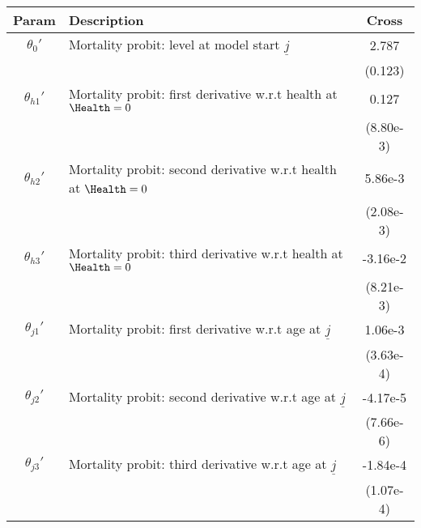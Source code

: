 \begin{table}[ht]\label{CrossWomenMortParams}
\footnotesize
\begin{center}
\begin{tabular}{clc}
\hline \hline
Param & Description & Cross \\
\hline
$\theta_{0}'$ & Mortality probit: level at model start $\underline{j}$ & 2.787 \\
 & & (0.123) \\
$\theta_{h1}'$ & Mortality probit: first derivative w.r.t health at $\Health=0$ & 0.127 \\
 & & (8.80e-3) \\
$\theta_{h2}'$ & Mortality probit: second derivative w.r.t health at $\Health=0$ & 5.86e-3 \\
 & & (2.08e-3) \\
$\theta_{h3}'$ & Mortality probit: third derivative w.r.t health at $\Health=0$ & -3.16e-2 \\
 & & (8.21e-3) \\
$\theta_{j1}'$ & Mortality probit: first derivative w.r.t age at $\underline{j}$ & 1.06e-3 \\
 & & (3.63e-4) \\
$\theta_{j2}'$ & Mortality probit: second derivative w.r.t age at $\underline{j}$ & -4.17e-5 \\
 & & (7.66e-6) \\
$\theta_{j3}'$ & Mortality probit: third derivative w.r.t age at $\underline{j}$ & -1.84e-4 \\
 & & (1.07e-4) \\
\hline\hline
\end{tabular}
\end{center}
\end{table}
